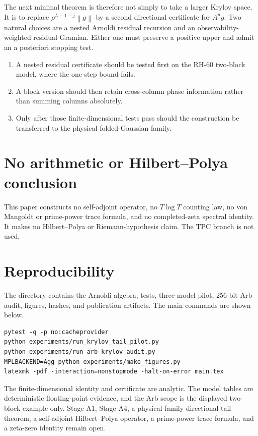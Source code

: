 \documentclass[11pt]{article}
\newcommand{\norm}[1]{\left\lVert#1\right\rVert}
\begin{document}
The next minimal theorem is therefore not simply to take a larger Krylov
space.  It is to replace $\rho^{L-1-j}\norm g$ by a second directional
certificate for $A^u g$.  Two natural choices are a nested Arnoldi
residual recursion and an observability-weighted residual Gramian.  Either
one must preserve a positive upper and admit an a posteriori stopping test.

\begin{enumerate}[leftmargin=2.2em]
 \item A nested residual certificate should be tested first on the RH-60
       two-block model, where the one-step bound fails.
 \item A block version should then retain cross-column phase information
       rather than summing columns absolutely.
 \item Only after those finite-dimensional tests pass should the construction
       be transferred to the physical folded-Gaussian family.
\end{enumerate}

\section{No arithmetic or Hilbert--Polya conclusion}

This paper constructs no self-adjoint operator, no $T\log T$ counting law,
no von Mangoldt or prime-power trace formula, and no completed-zeta
spectral identity.  It makes no Hilbert--Polya or Riemann-hypothesis claim.
The TPC branch is not used.

\section{Reproducibility}

The directory contains the Arnoldi algebra, tests, three-model pilot,
256-bit Arb audit, figures, hashes, and publication artifacts.  The main
commands are shown below.
\begin{verbatim}
pytest -q -p no:cacheprovider
python experiments/run_krylov_tail_pilot.py
python experiments/run_arb_krylov_audit.py
MPLBACKEND=Agg python experiments/make_figures.py
latexmk -pdf -interaction=nonstopmode -halt-on-error main.tex
\end{verbatim}

The finite-dimensional identity and certificate are analytic.  The model
tables are deterministic floating-point evidence, and the Arb scope is the
displayed two-block example only.  Stage A1, Stage A4, a physical-family
directional tail theorem, a self-adjoint Hilbert--Polya operator, a
prime-power trace formula, and a zeta-zero identity remain open.



\end{document}
